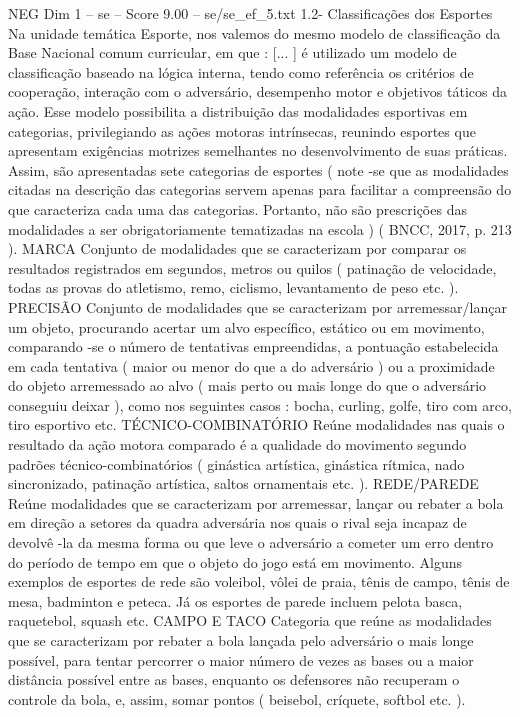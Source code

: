 \begin{textsample}{NEG Dim 1 – se – Score 9.00 – se/se\_ef\_5.txt}  \label{ex:f1_neg_209}
1.2- Classificações dos Esportes Na unidade temática Esporte, nos valemos do mesmo modelo de classificação da Base Nacional comum curricular, em que : [... ] é utilizado um modelo de classificação baseado na lógica interna, tendo como referência os critérios de cooperação, interação com o adversário, desempenho motor e objetivos táticos da ação.
Esse modelo possibilita a distribuição das modalidades esportivas em categorias, privilegiando as ações motoras intrínsecas, reunindo esportes que apresentam exigências motrizes semelhantes no desenvolvimento de suas práticas.
Assim, são apresentadas sete categorias de esportes ( note -se que as modalidades citadas na descrição das categorias servem apenas para facilitar a compreensão do que caracteriza cada uma das categorias.
Portanto, não são prescrições das modalidades a ser obrigatoriamente tematizadas na escola ) ( BNCC, 2017, p. 213 ).
MARCA Conjunto de modalidades que se caracterizam por comparar os resultados registrados em segundos, metros ou quilos ( patinação de velocidade, todas as provas do atletismo, remo, ciclismo, levantamento de peso etc. ).
PRECISÃO Conjunto de modalidades que se caracterizam por arremessar/lançar um objeto, procurando acertar um alvo específico, estático ou em movimento, comparando -se o número de tentativas empreendidas, a pontuação estabelecida em cada tentativa ( maior ou menor do que a do adversário ) ou a proximidade do objeto arremessado ao alvo ( mais perto ou mais longe do que o adversário conseguiu deixar ), como nos seguintes casos : bocha, curling, golfe, tiro com arco, tiro esportivo etc.
TÉCNICO-COMBINATÓRIO Reúne modalidades nas quais o resultado da ação motora comparado é a qualidade do movimento segundo padrões técnico-combinatórios ( ginástica artística, ginástica rítmica, nado sincronizado, patinação artística, saltos ornamentais etc. ).
REDE/PAREDE Reúne modalidades que se caracterizam por arremessar, lançar ou rebater a bola em direção a setores da quadra adversária nos quais o rival seja incapaz de devolvê -la da mesma forma ou que leve o adversário a cometer um erro dentro do período de tempo em que o objeto do jogo está em movimento.
Alguns exemplos de esportes de rede são voleibol, vôlei de praia, tênis de campo, tênis de mesa, badminton e peteca.
Já os esportes de parede incluem pelota basca, raquetebol, squash etc.
CAMPO E TACO Categoria que reúne as modalidades que se caracterizam por rebater a bola lançada pelo adversário o mais longe possível, para tentar percorrer o maior número de vezes as bases ou a maior distância possível entre as bases, enquanto os defensores não recuperam o controle da bola, e, assim, somar pontos ( beisebol, críquete, softbol etc. ).

\end{textsample}
